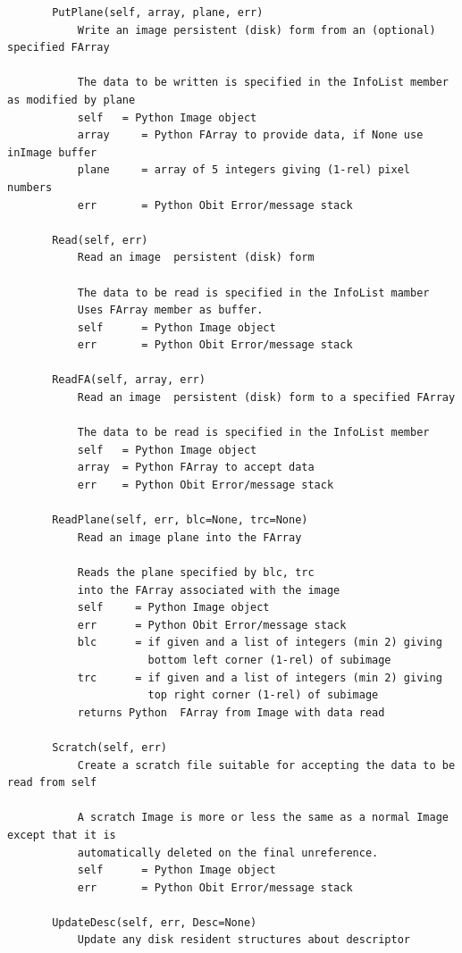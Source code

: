 \documentclass[11pt]{report}
\begin{document}
\begin{verbatim}
       PutPlane(self, array, plane, err)
           Write an image persistent (disk) form from an (optional) specified FArray
           
           The data to be written is specified in the InfoList member as modified by plane
           self   = Python Image object
           array     = Python FArray to provide data, if None use inImage buffer
           plane     = array of 5 integers giving (1-rel) pixel numbers
           err       = Python Obit Error/message stack
       
       Read(self, err)
           Read an image  persistent (disk) form
           
           The data to be read is specified in the InfoList mamber
           Uses FArray member as buffer.
           self      = Python Image object
           err       = Python Obit Error/message stack
       
       ReadFA(self, array, err)
           Read an image  persistent (disk) form to a specified FArray
           
           The data to be read is specified in the InfoList member
           self   = Python Image object
           array  = Python FArray to accept data
           err    = Python Obit Error/message stack
       
       ReadPlane(self, err, blc=None, trc=None)
           Read an image plane into the FArray 
           
           Reads the plane specified by blc, trc
           into the FArray associated with the image
           self     = Python Image object
           err      = Python Obit Error/message stack
           blc      = if given and a list of integers (min 2) giving
                      bottom left corner (1-rel) of subimage
           trc      = if given and a list of integers (min 2) giving
                      top right corner (1-rel) of subimage
           returns Python  FArray from Image with data read
       
       Scratch(self, err)
           Create a scratch file suitable for accepting the data to be read from self
           
           A scratch Image is more or less the same as a normal Image except that it is
           automatically deleted on the final unreference.
           self      = Python Image object
           err       = Python Obit Error/message stack
       
       UpdateDesc(self, err, Desc=None)
           Update any disk resident structures about descriptor
           

\end{verbatim}
\end{document}
